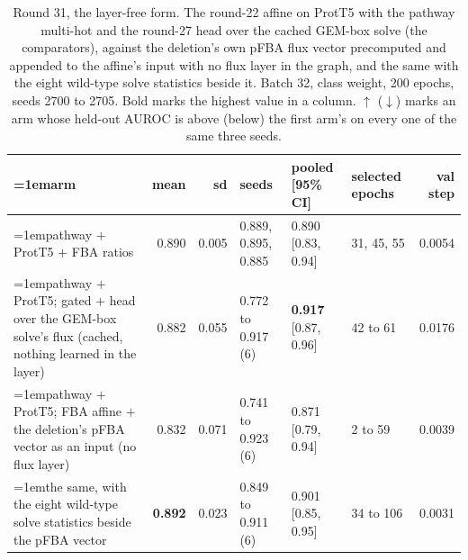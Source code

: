 \begin{table}[H]
  \centering
  \scriptsize
  \setlength{\tabcolsep}{2.5pt}
  \caption[Round 31, the layer-free form]{Round 31, the layer-free form. The round-22 affine on ProtT5 with the pathway multi-hot and the round-27 head over the cached GEM-box solve (the comparators), against the deletion's own pFBA flux vector precomputed and appended to the affine's input with no flux layer in the graph, and the same with the eight wild-type solve statistics beside it. Batch 32, class weight, 200 epochs, seeds 2700 to 2705. Bold marks the highest value in a column. $\uparrow$ ($\downarrow$) marks an arm whose held-out AUROC is above (below) the first arm's on every one of the same three seeds.}
  \label{tab:w47}
  \begin{tabular}{@{}>{\raggedright\hangindent=1em\hangafter=1\arraybackslash}p{83.4mm}rrlllr@{}}
    \hline
    arm & mean & sd & seeds & pooled [95\% CI] & selected epochs & val step \\
    \hline
    pathway $+$ ProtT5 $+$ FBA ratios & 0.890 & 0.005 & 0.889, 0.895, 0.885 & 0.890 [0.83, 0.94] & 31, 45, 55 & 0.0054 \\
    pathway $+$ ProtT5; gated $+$ head over the GEM-box solve's flux (cached, nothing learned in the layer) & 0.882 & 0.055 & 0.772 to 0.917 (6) & \textbf{0.917} [0.87, 0.96] & 42 to 61 & 0.0176 \\
    pathway $+$ ProtT5; FBA affine $+$ the deletion's pFBA vector as an input (no flux layer) & 0.832 & 0.071 & 0.741 to 0.923 (6) & 0.871 [0.79, 0.94] & 2 to 59 & 0.0039 \\
    the same, with the eight wild-type solve statistics beside the pFBA vector & \textbf{0.892} & 0.023 & 0.849 to 0.911 (6) & 0.901 [0.85, 0.95] & 34 to 106 & 0.0031 \\
    \hline
  \end{tabular}
\end{table}
